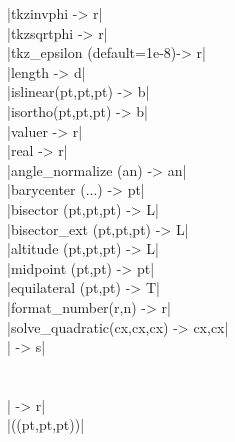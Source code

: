 \documentclass[DIV         = 14,
               fontsize    = 10,
               index       = totoc,
               twoside,
               cadre,
               headings    = small
               ]{tkz-doc}
\begin{document}
\begin{multicols}{3}
|tkzinvphi                 -> r|   \\
|tkzsqrtphi                -> r|   \\
|tkz_epsilon (default=1e-8)-> r|   \\
|length                    -> d|   \\
|islinear(pt,pt,pt)        -> b|   \\
|isortho(pt,pt,pt)         -> b|   \\
|value{r}                  -> r|   \\
|real                      -> r|   \\
|angle_normalize (an)      -> an|  \\
|barycenter (...)          -> pt|  \\
|bisector (pt,pt,pt)       -> L|   \\
|bisector_ext (pt,pt,pt)   -> L|   \\
|altitude (pt,pt,pt)       -> L|   \\
|midpoint (pt,pt)          -> pt|  \\
|equilateral (pt,pt)       -> T|   \\
|format_number(r,n)        -> r|   \\
|solve_quadratic(cx,cx,cx) -> cx,cx|   \\
|             -> s|   \\
                                   \\
             \\
|              -> r|   \\
|\tkzDrawLuaEllipse((pt,pt,pt))|   \\
\end{multicols}
\end{document}
